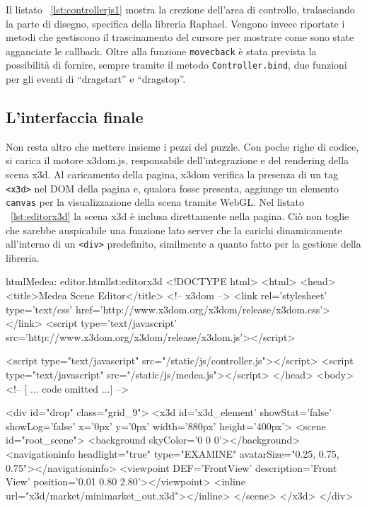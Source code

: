 Il listato ~\ref{lst:controllerjs1} mostra la crezione dell'area di controllo, tralasciando la parte di disegno, specifica della libreria Raphael. Vengono invece riportate i metodi che gestiscono il trascinamento del cursore per mostrare come sono state agganciate le callback. Oltre alla funzione \texttt{movecback} è stata prevista la possibilità di fornire, sempre tramite il metodo \texttt{Controller.bind}, due funzioni per gli eventi di ``dragstart'' e ``dragstop''.

\subsection{L'interfaccia finale}
Non resta altro che mettere insieme i pezzi del puzzle. Con poche righe di codice, si carica il motore x3dom.js, responsabile dell'integrazione e del rendering della scena x3d. Al caricamento della pagina, x3dom verifica la presenza di un tag \texttt{<x3d>} nel DOM della pagina e, qualora fosse presenta, aggiunge un elemento \texttt{canvas} per la visualizzazione della scena tramite WebGL. Nel listato ~\ref{lst:editorx3d} la scena x3d è inclusa direttamente nella pagina. Ciò non toglie che sarebbe auspicabile una funzione lato server che la carichi dinamicamente all'interno di un \texttt{<div>} predefinito, similmente a quanto fatto per la gestione della libreria.

\begin{mylisting}{html}{Medea: editor.html}{lst:editorx3d}
<!DOCTYPE html>
<html>
    <head>
        <title>Medea Scene Editor</title>
        <!-- x3dom -->
        <link rel='stylesheet' type='text/css' href='http://www.x3dom.org/x3dom/release/x3dom.css'></link>
        <script type='text/javascript' src='http://www.x3dom.org/x3dom/release/x3dom.js'></script>

        <script type="text/javascript" src="/static/js/controller.js"></script>
        <script type="text/javascript" src="/static/js/medea.js"></script>        
    </head>
    <body>
        <!-- [ ... code omitted ...] -->        
        
        <div id="drop" class="grid_9">
            <x3d id='x3d_element' showStat='false' showLog='false' x='0px' y='0px' width='880px' height='400px'>
                <scene id="root_scene">
                    <background skyColor='0 0 0'></background>
                    <navigationinfo headlight="true" type="EXAMINE" avatarSize="0.25, 0.75, 0.75"></navigationinfo>
                    <viewpoint DEF='FrontView' description='Front View' position='0.01 0.80 2.80'></viewpoint>
                    <inline url="x3d/market/minimarket_out.x3d"></inline>
                </scene>
            </x3d> 
        </div>
\end{mylisting}

